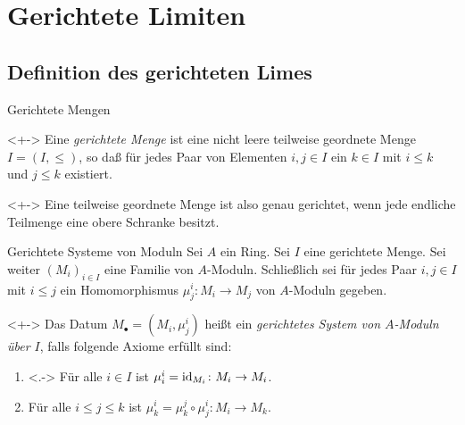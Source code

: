 \section{Gerichtete Limiten}

\subsection{Definition des gerichteten Limes}

\begin{frame}{Gerichtete Mengen}
	\begin{definition}<+->
		Eine \emph{gerichtete Menge} ist eine nicht leere teilweise geordnete Menge
		\(I = (I, \le)\), so daß für jedes Paar von Elementen \(i, j \in I\) ein
		\(k \in I\) mit \(i \le k\) und \(j \le k\) existiert.
	\end{definition}
	\begin{visibleenv}<+->
		Eine teilweise geordnete Menge ist also genau gerichtet, wenn jede endliche
		Teilmenge eine obere Schranke besitzt.
	\end{visibleenv}
\end{frame}

\begin{frame}{Gerichtete Systeme von Moduln}
	Sei \(A\) ein Ring. Sei \(I\) eine gerichtete Menge. Sei weiter \((M_i)_{i \in I}\)
	eine Familie von \(A\)-Moduln. Schließlich sei für jedes Paar \(i, j \in I\) mit
	\(i \le j\) ein Homomorphismus \(\mu^i_j\colon M_i \to M_j\) von \(A\)-Moduln
	gegeben.
	\begin{definition}<+->
		Das Datum \(M_\bullet = (M_i, \mu^i_j)\) heißt ein \emph{gerichtetes System
		von \(A\)-Moduln über \(I\)}, falls folgende Axiome erfüllt sind:
		\begin{enumerate}[<+->]
		\item<.->
			Für alle \(i \in I\) ist \(\mu^i_i = \operatorname{id}_{M_i}\colon M_i \to M_i\).
		\item
			Für alle \(i \le j \le k\) ist \(\mu^i_k = \mu^j_k \circ \mu^i_j\colon M_i \to M_k\).
		\end{enumerate}
	\end{definition}
\end{frame}

